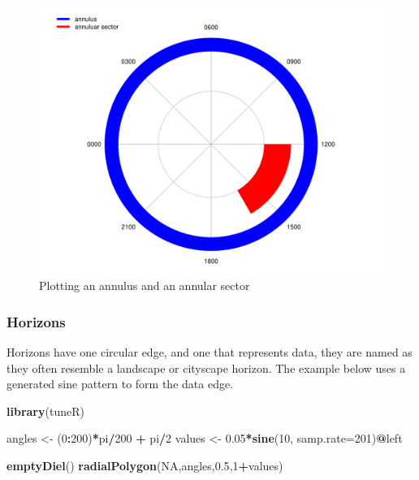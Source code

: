 \documentclass[
]{book}
\newenvironment{Shaded}{\begin{snugshade}}{\end{snugshade}}
\newcommand{\AttributeTok}[1]{\textcolor[rgb]{0.13,0.29,0.53}{#1}}
\newcommand{\ConstantTok}[1]{\textcolor[rgb]{0.56,0.35,0.01}{#1}}
\newcommand{\DecValTok}[1]{\textcolor[rgb]{0.00,0.00,0.81}{#1}}
\newcommand{\FloatTok}[1]{\textcolor[rgb]{0.00,0.00,0.81}{#1}}
\newcommand{\FunctionTok}[1]{\textcolor[rgb]{0.13,0.29,0.53}{\textbf{#1}}}
\newcommand{\NormalTok}[1]{#1}
\newcommand{\OtherTok}[1]{\textcolor[rgb]{0.56,0.35,0.01}{#1}}
\newcommand{\SpecialCharTok}[1]{\textcolor[rgb]{0.81,0.36,0.00}{\textbf{#1}}}
\begin{document}
\begin{figure}

{\centering \includegraphics[width=0.9\linewidth]{_main_files/figure-latex/radialPolygon-annuli-1} 

}

\caption{Plotting an annulus and an annular sector}\label{fig:radialPolygon-annuli}
\end{figure}

\hypertarget{horizons}{%
\subsubsection{Horizons}\label{horizons}}

Horizons have one circular edge, and one that represents data, they are named as they often resemble a landscape or cityscape horizon. The example below uses a generated sine pattern to form the data edge.

\begin{Shaded}
\begin{Highlighting}[]
\FunctionTok{library}\NormalTok{(tuneR)}

\NormalTok{angles }\OtherTok{\textless{}{-}}\NormalTok{ (}\DecValTok{0}\SpecialCharTok{:}\DecValTok{200}\NormalTok{)}\SpecialCharTok{*}\NormalTok{pi}\SpecialCharTok{/}\DecValTok{200} \SpecialCharTok{+}\NormalTok{ pi}\SpecialCharTok{/}\DecValTok{2}
\NormalTok{values }\OtherTok{\textless{}{-}} \FloatTok{0.05}\SpecialCharTok{*}\FunctionTok{sine}\NormalTok{(}\DecValTok{10}\NormalTok{, }\AttributeTok{samp.rate=}\DecValTok{201}\NormalTok{)}\SpecialCharTok{@}\NormalTok{left}

\FunctionTok{emptyDiel}\NormalTok{()}
\FunctionTok{radialPolygon}\NormalTok{(}\ConstantTok{NA}\NormalTok{,angles,}\FloatTok{0.5}\NormalTok{,}\DecValTok{1}\SpecialCharTok{+}\NormalTok{values)}
\end{Highlighting}
\end{Shaded}
\end{document}
